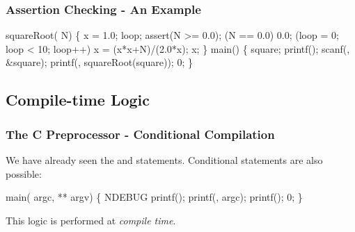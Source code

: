 \documentclass[smaller,handout,table]{beamer}
\begin{document}
\begin{frame}[fragile]
\frametitle{Assertion Checking - An Example}
\vspace{-0.2in}
\begin{semiverbatim}
\scriptsize
\kr\kl{} 
\kl{} 
\kl{}
\kl{} squareRoot( N)
\kl\{
\kl   {} x = 1.0;
\kl   {} loop;
\kl   {}
\kl   assert(N >= 0.0);
\kl   {} (N == 0.0)  0.0;
\kl   {} (loop = 0; loop < 10; loop++)
\kl      x = (x*x+N)/(2.0*x);
\kl   {} x;
\kl\}
\kl
\kl{} main()
\kl\{
\kl   {} square;
\kl   printf();
\kl   scanf(, \&square);
\kl   {}
\kl   printf(, squareRoot(square));
\kl   {} 0;
\kl\}
\end{semiverbatim}
\end{frame}

\subsection{Compile-time Logic}
\begin{frame}[fragile]
\frametitle{The C Preprocessor - Conditional Compilation}
We have already seen the {\tt {}} and {\tt {}} statements. Conditional statements are also possible:
\vspace{-0.2in}
\begin{semiverbatim}
\small
\kr\kl{} 
\kl
\kl{} main( argc,  ** argv)
\kl\{
\kl{} NDEBUG
\kl   printf();
\kl   printf(, argc);
\kl{}
\kl   printf();
\kl{}
\kl   {} 0;
\kl\}
\end{semiverbatim}
\begin{alertblock}{}
This logic is performed at \emph{compile time}.
\end{alertblock}
\end{frame}
\end{document}
